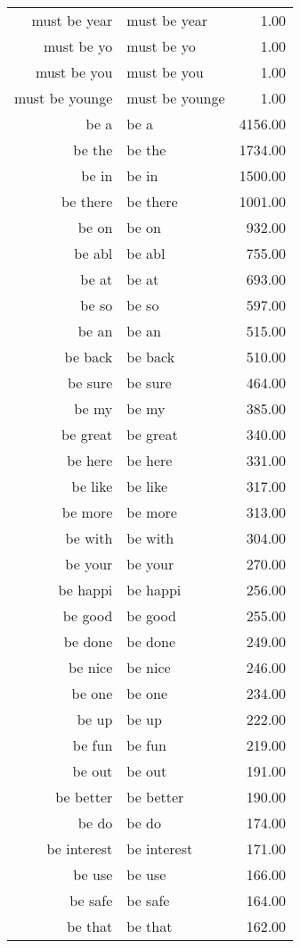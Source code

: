 \begin{table}[ht]
\begin{tabular}{rlr}
  must be year & must be year & 1.00 \\ 
  must be yo & must be yo & 1.00 \\ 
  must be you & must be you & 1.00 \\ 
  must be younge & must be younge & 1.00 \\ 
  be a & be a & 4156.00 \\ 
  be the & be the & 1734.00 \\ 
  be in & be in & 1500.00 \\ 
  be there & be there & 1001.00 \\ 
  be on & be on & 932.00 \\ 
  be abl & be abl & 755.00 \\ 
  be at & be at & 693.00 \\ 
  be so & be so & 597.00 \\ 
  be an & be an & 515.00 \\ 
  be back & be back & 510.00 \\ 
  be sure & be sure & 464.00 \\ 
  be my & be my & 385.00 \\ 
  be great & be great & 340.00 \\ 
  be here & be here & 331.00 \\ 
  be like & be like & 317.00 \\ 
  be more & be more & 313.00 \\ 
  be with & be with & 304.00 \\ 
  be your & be your & 270.00 \\ 
  be happi & be happi & 256.00 \\ 
  be good & be good & 255.00 \\ 
  be done & be done & 249.00 \\ 
  be nice & be nice & 246.00 \\ 
  be one & be one & 234.00 \\ 
  be up & be up & 222.00 \\ 
  be fun & be fun & 219.00 \\ 
  be out & be out & 191.00 \\ 
  be better & be better & 190.00 \\ 
  be do & be do & 174.00 \\ 
  be interest & be interest & 171.00 \\ 
  be use & be use & 166.00 \\ 
  be safe & be safe & 164.00 \\ 
  be that & be that & 162.00 \\ 

\end{tabular}
\end{table}
